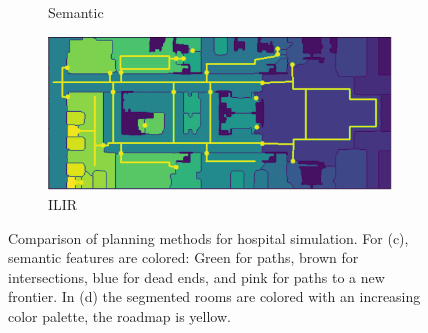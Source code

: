 \begin{figure}[h]
\begin{subfigure}{.5\textwidth}
      \caption{Semantic \cite{fredriksson_semantic_2023}}
    \end{subfigure}%
    \begin{subfigure}{.5\textwidth}
      \centering
      \includegraphics[width=\textwidth]{figures/60_results/aws_roadmap_horizontal.png}\vspace{5pt}
      \caption{ILIR}
    \end{subfigure}
    \caption[Comparison of planning methods for the hospital simulation]{Comparison of planning methods for hospital simulation. For (c), semantic features are colored: Green for paths, brown for intersections, blue for dead ends, and pink for paths to a new frontier. In (d) the segmented rooms are colored with an increasing color palette, the roadmap is yellow.}
    \label{fig:aws_comparison}
\end{figure}

